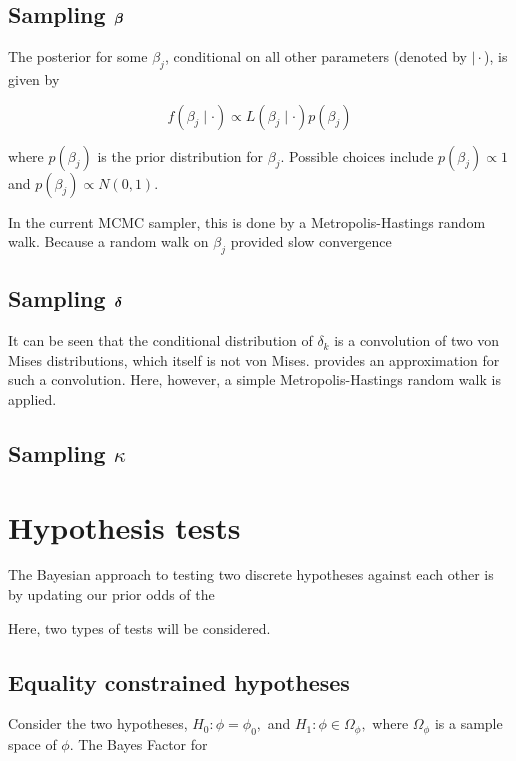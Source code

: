 \documentclass[10pt,a4paper]{article}\usepackage[]{graphicx}\usepackage[]{color}
\begin{document}
\subsection{Sampling $\boldsymbol{\beta}$}

The posterior for some \( \beta_j \), conditional on all other parameters (denoted by \( \mid \cdot \)), is given by

\[ f(\beta_j \mid \cdot ) \propto L (\beta_j \mid \cdot) p (\beta_j) \]

where \( p(\beta_j) \) is the prior distribution for \( \beta_j \). Possible choices include \( p(\beta_j) \propto 1 \) and \( p(\beta_j) \propto N(0, 1).\)

In the current MCMC sampler, this is done by a Metropolis-Hastings random walk. Because a random walk on \( \beta_j \) provided slow convergence

\subsection{Sampling $\boldsymbol{\delta}$}

It can be seen that the conditional distribution of \( \delta_k \) is a convolution of two von Mises distributions, which itself is not von Mises. \citet[p. 44]{mardia1999directional} provides an approximation for such a convolution. Here, however, a simple Metropolis-Hastings random walk is applied.

\subsection{Sampling $\kappa$}

\section{Hypothesis tests}

The Bayesian approach to testing two discrete hypotheses against each other is by updating our prior odds of the

Here, two types of tests will be considered.

\subsection{Equality constrained hypotheses}

Consider the two hypotheses, \( H_0 : \phi = \phi_0, \) and \( H_1 : \phi \in \Omega_\phi, \) where \( \Omega_\phi \) is a sample space of \( \phi \). The Bayes Factor for
\end{document}
